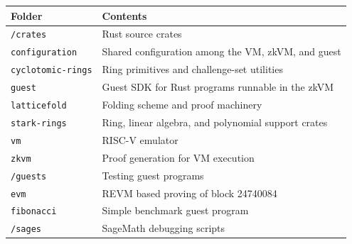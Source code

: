 {\small
\begin{tabularx}{\textwidth}{@{}p{}X@{}}
	\toprule
	\textbf{Folder}                                        & \textbf{Contents}                                   \\
	\midrule
	\texttt{/crates}                                       & Rust source crates                                  \\
	\hspace*{1em}\texttt{configuration}                    & Shared configuration among the VM, zkVM, and guest  \\
	\hspace*{1em}\texttt{cyclotomic-rings}\footnotemark[1] & Ring primitives and challenge-set utilities         \\
	\hspace*{1em}\texttt{guest}                            & Guest SDK for Rust programs runnable in the zkVM    \\
	\hspace*{1em}\texttt{latticefold}\footnotemark[1]      & Folding scheme and proof machinery                  \\
	\hspace*{1em}\texttt{stark-rings}\footnotemark[2]      & Ring, linear algebra, and polynomial support crates \\
	\hspace*{1em}\texttt{vm}                               & RISC-V emulator                                     \\
	\hspace*{1em}\texttt{zkvm}                             & Proof generation for VM execution                   \\
	\addlinespace
	\texttt{/guests}                                       & Testing guest programs                              \\
	\hspace*{1em}\texttt{evm}                              & REVM based proving of block 24740084                \\
	\hspace*{1em}\texttt{fibonacci}                        & Simple benchmark guest program                      \\
	\addlinespace
	\texttt{/sages}                                        & SageMath debugging scripts                          \\
	\bottomrule
\end{tabularx}
}

